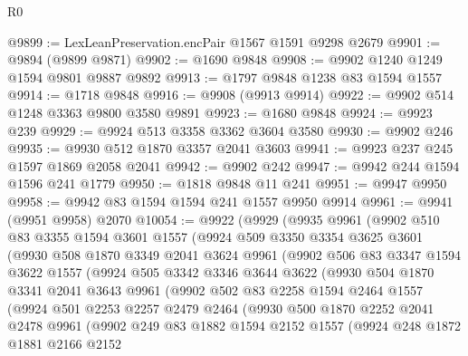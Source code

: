 \begin{lexlean}{R0}
\begin{coremodule}
@9899 := LexLeanPreservation.encPair @1567 @1591 @9298 @2679
@9901 := @9894 (@9899 @9871)
@9902 := @1690 @9848
@9908 := @9902 @1240 @1249 @1594 @9801 @9887 @9892
@9913 := @1797 @9848 @1238 @83 @1594 @1557
@9914 := @1718 @9848
@9916 := @9908 (@9913 @9914)
@9922 := @9902 @514 @1248 @3363 @9800 @3580 @9891
@9923 := @1680 @9848
@9924 := @9923 @239
@9929 := @9924 @513 @3358 @3362 @3604 @3580
@9930 := @9902 @246
@9935 := @9930 @512 @1870 @3357 @2041 @3603
@9941 := @9923 @237 @245 @1597 @1869 @2058 @2041
@9942 := @9902 @242
@9947 := @9942 @244 @1594 @1596 @241 @1779
@9950 := @1818 @9848 @11 @241
@9951 := @9947 @9950
@9958 := @9942 @83 @1594 @1594 @241 @1557 @9950 @9914
@9961 := @9941 (@9951 @9958) @2070
@10054 := @9922
    (@9929
      (@9935
        @9961
        (@9902
          @510
          @83
          @3355
          @1594
          @3601
          @1557
          (@9924
            @509
            @3350
            @3354
            @3625
            @3601
            (@9930
              @508
              @1870
              @3349
              @2041
              @3624
              @9961
              (@9902
                @506
                @83
                @3347
                @1594
                @3622
                @1557
                (@9924
                  @505
                  @3342
                  @3346
                  @3644
                  @3622
                  (@9930
                    @504
                    @1870
                    @3341
                    @2041
                    @3643
                    @9961
                    (@9902
                      @502
                      @83
                      @2258
                      @1594
                      @2464
                      @1557
                      (@9924
                        @501
                        @2253
                        @2257
                        @2479
                        @2464
                        (@9930
                          @500
                          @1870
                          @2252
                          @2041
                          @2478
                          @9961
                          (@9902
                            @249
                            @83
                            @1882
                            @1594
                            @2152
                            @1557
                            (@9924
                              @248
                              @1872
                              @1881
                              @2166
                              @2152

\end{coremodule}
\end{lexlean}
